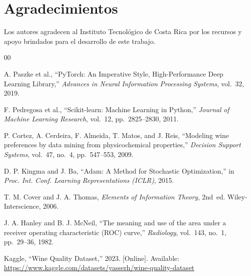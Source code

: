 \documentclass[conference]{IEEEtran}
\begin{document}
\section*{Agradecimientos}

Los autores agradecen al Instituto Tecnol\'{o}gico de Costa Rica por los recursos y apoyo brindados para el desarrollo de este trabajo.

\begin{thebibliography}{00}

A. Paszke et al., ``PyTorch: An Imperative Style, High-Performance Deep Learning Library,''
\textit{Advances in Neural Information Processing Systems}, vol.~32, 2019.

F. Pedregosa et al., ``Scikit-learn: Machine Learning in Python,''
\textit{Journal of Machine Learning Research}, vol.~12, pp.~2825--2830, 2011.

P. Cortez, A. Cerdeira, F. Almeida, T. Matos, and J. Reis,
``Modeling wine preferences by data mining from physicochemical properties,''
\textit{Decision Support Systems}, vol.~47, no.~4, pp.~547--553, 2009.

D. P. Kingma and J. Ba,
``Adam: A Method for Stochastic Optimization,''
in \textit{Proc. Int. Conf. Learning Representations (ICLR)}, 2015.

T. M. Cover and J. A. Thomas,
\textit{Elements of Information Theory}, 2nd~ed.
Wiley-Interscience, 2006.

J. A. Hanley and B. J. McNeil,
``The meaning and use of the area under a receiver operating characteristic (ROC) curve,''
\textit{Radiology}, vol.~143, no.~1, pp.~29--36, 1982.

Kaggle, ``Wine Quality Dataset,'' 2023.
[Online]. Available: \url{https://www.kaggle.com/datasets/yasserh/wine-quality-dataset}

\end{thebibliography}
\end{document}
